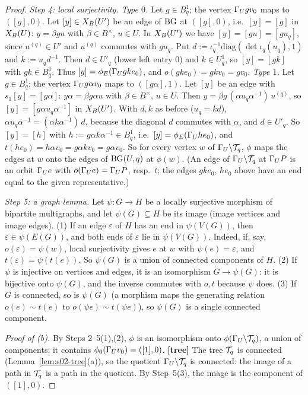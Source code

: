 \begin{proof}
\emph{Step 4: local surjectivity.} \emph{Type $0$.} Let $g\in B^1_q$; the vertex $\Gamma_U gv_0$ maps to $([g],0)$. Let $[y]\in X_B(U')$ be an
edge of $\mathrm{BG}$ at $([g],0)$, i.e.\ $[y]=[g]$ in $X_B(U)$: $y=\beta gu$ with $\beta\in B^\times$, $u\in U$. In $X_B(U')$ we have
$[y]=[gu]=[gu_q]$, since $u^{(q)}\in U'$ and $u^{(q)}$ commutes with $gu_q$. Put $d:=\iota_q^{-1}\mathrm{diag}(\det\iota_q(u_q),1)$ and
$k:=u_qd^{-1}$. Then $d\in U'_q$ (lower left entry $0$) and $k\in U^1_q$, so $[y]=[gk]$ with $gk\in B^1_q$. Thus
$[y]=\phi_E(\Gamma_U gke_0)$, and $o(gke_0)=gkv_0=gv_0$.
\emph{Type $1$.} Let $g\in B^1_q$; the vertex $\Gamma_U g\alpha v_0$ maps to $([g\alpha],1)$. Let $[y]$ be an edge with $s_1[y]=[g\alpha]$:
$y\alpha=\beta g\alpha u$ with $\beta\in B^\times$, $u\in U$. Then $y=\beta g\,(\alpha u_q\alpha^{-1})\,u^{(q)}$, so $[y]=[g\alpha u_q\alpha^{-1}]$ in
$X_B(U')$. With $d,k$ as before ($u_q=kd$), $\alpha u_q\alpha^{-1}=(\alpha k\alpha^{-1})\,d$, because the diagonal $d$ commutes with $\alpha$, and
$d\in U'_q$. So $[y]=[h]$ with $h:=g\alpha k\alpha^{-1}\in B^1_q$, i.e.\ $[y]=\phi_E(\Gamma_U he_0)$, and
$t(he_0)=h\alpha v_0=g\alpha kv_0=g\alpha v_0$.
So for every vertex $w$ of $\Gamma_U\backslash\mathcal{T}_q$, $\phi$ maps the edges at $w$ onto the edges of $\mathrm{BG}(U,q)$ at $\phi(w)$. (An edge of
$\Gamma_U\backslash\mathcal{T}_q$ at $\Gamma_U P$ is an orbit $\Gamma_U e$ with $\bar o(\Gamma_U e)=\Gamma_U P$, resp.\ $\bar t$; the edges $gke_0$, $he_0$ above have
an end equal to the given representative.)

\emph{Step 5: a graph lemma.} Let $\psi:G\to H$ be a locally surjective morphism of bipartite multigraphs, and let
$\psi(G)\subseteq H$ be its image (image vertices and image edges). (1) If an edge $\varepsilon$ of $H$ has an end in $\psi(V(G))$, then
$\varepsilon\in\psi(E(G))$, and both ends of $\varepsilon$ lie in $\psi(V(G))$. Indeed, if, say, $o(\varepsilon)=\psi(w)$, local
surjectivity gives $e$ at $w$ with $\psi(e)=\varepsilon$, and $t(\varepsilon)=\psi(t(e))$. So $\psi(G)$ is a union of connected
components of $H$. (2) If $\psi$ is injective on vertices and edges, it is an isomorphism $G\to\psi(G)$: it is bijective onto
$\psi(G)$, and the inverse commutes with $o,t$ because $\psi$ does. (3) If $G$ is connected, so is $\psi(G)$ (a morphism maps the
generating relation $o(e)\sim t(e)$ to $o(\psi e)\sim t(\psi e)$), so $\psi(G)$ is a single connected component.

\emph{Proof of (b).} By Steps 2--5(1),(2), $\phi$ is an isomorphism onto $\phi(\Gamma_U\backslash\mathcal{T}_q)$, a union of components; it
contains $\phi_0(\Gamma_U v_0)=([1],0)$. \textbf{[tree]} The tree $\mathcal{T}_q$ is connected (Lemma~\ref{lem:s02-tree}(a)), so the quotient
$\Gamma_U\backslash\mathcal{T}_q$ is connected: the image of a path in $\mathcal{T}_q$ is a path in the quotient. By Step~5(3), the image is the component
of $([1],0)$.


\end{proof}
